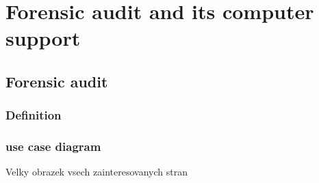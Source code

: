 \chapter{Forensic audit and its computer support}
\section{Forensic audit}

\subsection*{Definition}
\subsection*{use case diagram}
Velky obrazek vsech zainteresovanych stran
